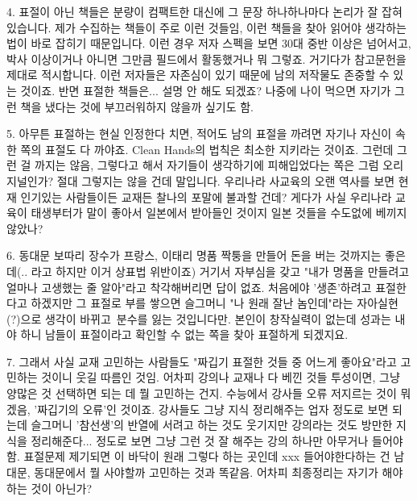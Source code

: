 \item 4. 표절이 아닌 책들은 분량이 컴팩트한 대신에 그 문장 하나하나마다 논리가 잘 잡혀있습니다.
제가 수집하는 책들이 주로 이런 것들임, 이런 책들을 찾아 읽어야 생각하는 법이 바로 잡히기 때문입니다.
이런 경우 저자 스펙을 보면 30대 중반 이상은 넘어서고, 박사 이상이거나 아니면 그만큼 필드에서 활동했거나 뭐 그렇죠.
거기다가 참고문헌을 제대로 적시합니다. 이런 저자들은 자존심이 있기 때문에 남의 저작물도 존중할 수 있는 것이죠.
반면 표절한 책들은... 설명 안 해도 되겠죠? 나중에 나이 먹으면 자기가 그런 책을 냈다는 것에 부끄러워하지 않을까 싶기도 함.
\vspace{5mm}

\item 5. 아무튼 표절하는 현실 인정한다 치면, 적어도 남의 표절을 까려면 자기나 자신이 속한 쪽의 표절도 다 까야죠.
Clean Hands의 법칙은 최소한 지키라는 것이죠. 그런데 그런 걸 까지는 않음,
그렇다고 해서 자기들이 생각하기에 피해입었다는 쪽은 그럼 오리지널인가?
절대 그렇지는 않을 건데 말입니다. 우리나라 사교육의 오랜 역사를 보면 현재 인기있는 사람들이든 교재든 찰나의 포말에 불과할 건데?
게다가 사실 우리나라 교육이 태생부터가 말이 좋아서 일본에서 받아들인 것이지 일본 것들을 수도없에 베끼지 않았나?
\vspace{5mm}

\item 6. 동대문 보따리 장수가 프랑스, 이태리 명품 짝퉁을 만들어 돈을 버는 것까지는 좋은데(.. 라고 하지만 이거 상표법 위반이죠)
거기서 자부심을 갖고 "내가 명품을 만들려고 얼마나 고생했는 줄 알아"라고 착각해버리면 답이 없죠.
처음에야 '생존'하려고 표절한다고 하겠지만 그 표절로 부를 쌓으면
슬그머니 "나 원래 잘난 놈인데"라는 자아실현(?)으로 생각이 바뀌고 분수를 잃는 것입니다만.
본인이 창작실력이 없는데 성과는 내야 하니 남들이 표절이라고 확인할 수 없는 쪽을 찾아 표절하게 되겠지요.
\vspace{5mm}

7. 그래서 사실 교재 고민하는 사람들도 "짜깁기 표절한 것들 중 어느게 좋아요"라고 고민하는 것이니 웃길 따름인 것임.
어차피 강의나 교재나 다 베낀 것들 투성이면, 그냥 양많은 것 선택하면 되는 데 뭘 고민하는 건지.
수능에서 강사들 오류 저지르는 것이 뭐겠음, '짜깁기의 오류'인 것이죠.
강사들도 그냥 지식 정리해주는 업자 정도로 보면 되는데 슬그머니 '참선생'의 반열에 서려고 하는 것도 웃기지만
강의라는 것도 방만한 지식을 정리해준다... 정도로 보면 그냥 그런 것 잘 해주는 강의 하나만 아무거나 들어야 함.
표절문제 제기되면 이 바닥이 원래 그렇다 하는 곳인데 xxx 들어야한다하는 건 남대문, 동대문에서 뭘 사야할까 고민하는 것과 똑같음.
어차피 최종정리는 자기가 해야하는 것이 아닌가?
\vspace{5mm}

